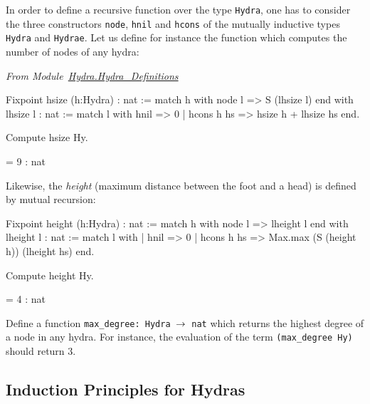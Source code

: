 In order to  define a recursive function over the type \texttt{Hydra}, one has to consider the three constructors 
\texttt{node}, \texttt{hnil} and \texttt{hcons} of the mutually inductive types \texttt{Hydra} and \texttt{Hydrae}. 
Let us define for instance the function which  computes the number of nodes of any hydra:

\vspace{4pt}
\noindent
\emph{From Module~\href{../theories/html/hydras.Hydra.Hydra_Definitions.html}{Hydra.Hydra\_Definitions}}


\begin{Coqsrc}
Fixpoint hsize (h:Hydra) : nat :=
  match h with node l => S (lhsize l)
  end
with lhsize l : nat :=
  match l with hnil => 0
            | hcons h hs => hsize h + lhsize hs 
  end.

 Compute hsize Hy.
\end{Coqsrc}

\begin{Coqanswer}
 = 9
     : nat 
\end{Coqanswer}


Likewise, the \emph{height} (maximum distance between the foot and a head) 
is defined by mutual recursion:

\begin{Coqsrc}
Fixpoint height  (h:Hydra) : nat :=
  match h with node l => lheight l
  end
with lheight l : nat :=
  match l with 
  | hnil => 0
  | hcons h hs => Max.max (S (height h)) (lheight hs)
  end.
\end{Coqsrc}

\begin{Coqsrc}
Compute height Hy.
\end{Coqsrc}

\begin{Coqanswer}
 = 4
     : nat  
\end{Coqanswer}


\begin{exercise}
Define a function \texttt{max\_degree: Hydra $\mbox{$\rightarrow$}$ nat} which  returns the highest degree of a node in any hydra. For instance, the evaluation of the term \texttt{(max\_degree Hy)} should return $3$.
\end{exercise}

\subsection{Induction Principles for Hydras}
\label{sec:orgheadline42}


